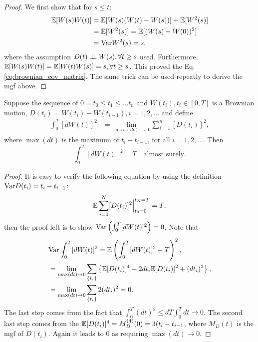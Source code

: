 \begin{proof}
We first show that for $s\le t$:
\begin{equation}
\begin{aligned}
\mathbb{E}[W(s)W(t)]&=\mathbb{E}[W(s)(W(t)-W(s))]+\mathbb{E}[W^2(s)]\\
&=\mathbb{E}[W^2(s)]=\mathbb{E}[(W(s)-W(0))^2]\\
&=\text{Var} W^2(s)=s,
\end{aligned}
\end{equation}
where the assumption $D(t)\perp\!\!\!\perp W(s),\forall t\ge s$ used. Furthermore, $\mathbb{E}[W(s)W(t)]=\mathbb{E}[W(t)W(s)]=s,\forall t\ge s$. This proved the Eq.\ref{eq:brownian_cov_matrix}. The same trick can be used repeatly to derive the mgf above.
\end{proof}

\begin{theorem}
Suppose the sequence of $0=t_0\le t_1\le\dots t_n$ and $W(t_i),t_i\in [0,T]$ is a Brownian motion, $D(t_i)=W(t_i)-W(t_{i-1}),i=1,2,\dots$ and define
\begin{equation}
\begin{aligned}
\int_0^T[dW(t)]^2&=\lim_{\max(dt)\to 0}\sum_{i=1}^n[D(t_i)]^2,
\end{aligned}
\end{equation}
where $\max(dt)$ is the maximum of $t_i-t_{i-1}$, for all $i=1,2,\dots$. Then
\begin{equation}
\int_0^T[dW(t)]^2 = T \quad\text{almost surely.}
\end{equation}
\end{theorem}

\begin{proof}
It is easy to verify the following equation by using the definition $\text{Var} D(t_i)=t_i-t_{i-1}$:
\begin{equation}
\mathbb{E} \sum_{i=0}^N[D(t_i)]^2\Big|^{t_N=T}_{t_0=0}=T,
\end{equation}
then the proof left is to show $\text{Var}\left(\int_0^T[dW(t)]^2\right)=0$. Note that
\begin{equation*}
\begin{aligned}
&\text{Var}\int_0^T[dW(t)]^2=\mathbb{E}\left(\int_0^T[dW(t)]^2-T\right)^2,\\
&=\lim_{\max(dt)\to0} \sum_{\{t_i\}}\left\{\mathbb{E} [D(t_i)]^4-2dt_i\mathbb{E} [D(t_i)]^2+(dt_i)^2\right\},\\
&=\lim_{\max(dt)\to0} \sum_{\{t_i\}}2(dt_i)^2=0.
\end{aligned}
\end{equation*}
The last step comes from the fact that $\int_0^T (dt)^2\le dT\int_0^T dt\to0$. The second last step comes from the $\mathbb{E} [D(t_i)]^4=M_D^{(4)}(0)=3(t_i-t_{i-1}$, where $M_D(t)$ is the mgf of $D(t_i)$. Again it leads to 0 as requiring $\max(dt)\to0$.
\end{proof}

